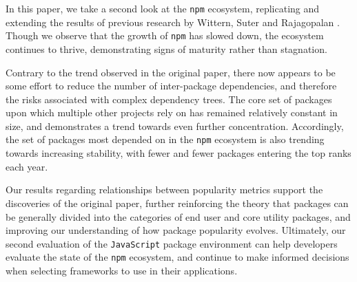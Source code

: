 \documentclass[10pt,conference]{IEEEtran}
\def\code#1{\texttt{#1}}
\begin{document}
In this paper, we take a second look at the \code{npm} ecosystem,
replicating and extending the results of previous research by 
Wittern, Suter and Rajagopalan \cite{Wittern:2016}. Though
we observe that the growth of \code{npm} has slowed down, the ecosystem
continues to thrive, demonstrating signs of maturity rather than stagnation.

Contrary to the trend observed in the original paper, there now appears to be
some effort to reduce the number of inter-package dependencies, and therefore the risks
associated with complex dependency trees. The core set of packages upon which
multiple other projects rely on has remained relatively constant in size, and
demonstrates a trend towards even further concentration. Accordingly, the set of packages
most depended on in the \code{npm} ecosystem is also trending towards increasing stability, with
fewer and fewer packages entering the top ranks each year. 

Our results regarding relationships between popularity metrics support the discoveries of the
original paper, further reinforcing the theory that packages can be generally divided into the categories
of end user and core utility packages, and improving our understanding of how package popularity evolves.
Ultimately, our second evaluation of the \code{JavaScript} package environment can help developers evaluate
the state of the \code{npm} ecosystem, and continue to make informed decisions when selecting frameworks
to use in their applications.
\end{document}

